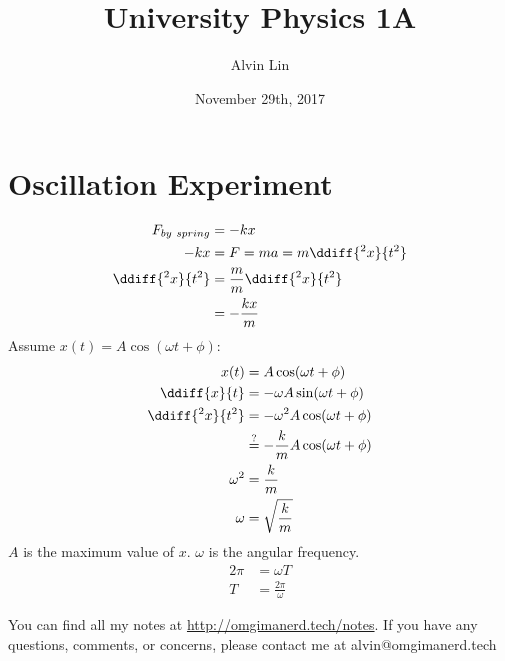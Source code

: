 \documentclass{math}
\title{University Physics 1A}
\author{Alvin Lin}
\date{November 29th, 2017}
\begin{document}
\maketitle

\section*{Oscillation Experiment}
\begin{align*}
  F_{by~spring} &= -kx \\
  -kx &= F = ma = m\ddiff{^2x}{t^2} \\
  \ddiff{^2x}{t^2} &= \frac{m}{m}\ddiff{^2x}{t^2} \\
  &= -\frac{kx}{m} \\
\end{align*}
Assume \( x(t) = A\cos(\omega t+\phi) \):
\begin{align*}
  x(t) &= A\cos(\omega t+\phi) \\
  \ddiff{x}{t} &= -\omega A\sin(\omega t+\phi) \\
  \ddiff{^2x}{t^2} &= -\omega^2A\cos(\omega t+\phi) \\
  &\stackrel{?}{=} -\frac{k}{m}A\cos(\omega t+\phi) \\
  \omega^2 &= \frac{k}{m} \\
  \omega &= \sqrt{\frac{k}{m}}
\end{align*}
\( A \) is the maximum value of \( x \). \( \omega \) is the angular frequency.
\begin{align*}
  2\pi &= \omega T \\
  T &= \frac{2\pi}{\omega}
\end{align*}

\begin{center}
  You can find all my notes at \url{http://omgimanerd.tech/notes}. If you have
  any questions, comments, or concerns, please contact me at
  alvin@omgimanerd.tech
\end{center}
\end{document}

